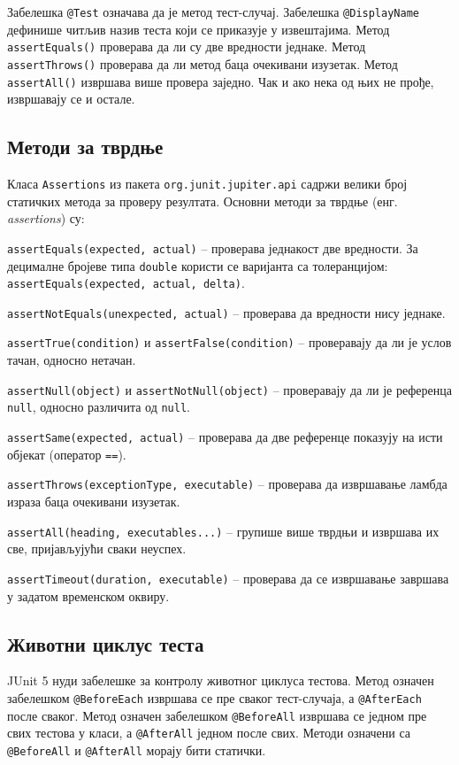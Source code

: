 Забелешка \texttt{@Test} означава да је метод тест-случај. Забелешка \texttt{@DisplayName} дефинише читљив назив теста који се приказује у извештајима. Метод \texttt{assertEquals()} проверава да ли су две вредности једнаке. Метод \texttt{assertThrows()} проверава да ли метод баца очекивани изузетак. Метод \texttt{assertAll()} извршава више провера заједно. Чак и ако нека од њих не прође, извршавају се и остале.


\subsection{Методи за тврдње}

Класа \texttt{Assertions} из пакета \texttt{org.junit.jupiter.api} садржи велики број статичких метода за проверу резултата. Основни методи за тврдње (енг. \textit{assertions}) су:

\texttt{assertEquals(expected, actual)} – проверава једнакост две вредности. За децималне бројеве типа \texttt{double} користи се варијанта са толеранцијом: \texttt{assertEquals(expected, actual, delta)}.

\texttt{assertNotEquals(unexpected, actual)} – проверава да вредности нису једнаке.

\texttt{assertTrue(condition)} и \texttt{assertFalse(condition)} – проверавају да ли је услов тачан, односно нетачан.

\texttt{assertNull(object)} и \texttt{assertNotNull(object)} – проверавају да ли је референца \texttt{null}, односно различита од \texttt{null}.

\texttt{assertSame(expected, actual)} – проверава да две референце показују на исти објекат (оператор \texttt{==}).

\texttt{assertThrows(exceptionType, executable)} – проверава да извршавање ламбда израза баца очекивани изузетак.

\texttt{assertAll(heading, executables...)} – групише више тврдњи и извршава их све, пријављујући сваки неуспех.

\texttt{assertTimeout(duration, executable)} – проверава да се извршавање завршава у задатом временском оквиру.


\subsection{Животни циклус теста}

JUnit 5 нуди забелешке за контролу животног циклуса тестова. Метод означен забелешком \texttt{@BeforeEach} извршава се пре сваког тест-случаја, а \texttt{@AfterEach} после сваког. Метод означен забелешком \texttt{@BeforeAll} извршава се једном пре свих тестова у класи, а \texttt{@AfterAll} једном после свих. Методи означени са \texttt{@BeforeAll} и \texttt{@AfterAll} морају бити статички.


